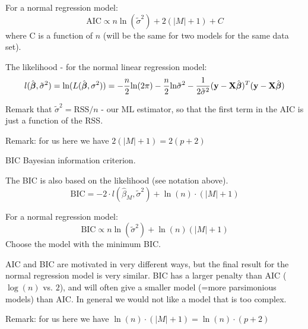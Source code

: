 \documentclass[ignorenonframetext,]{beamer}
\begin{document}
\begin{frame}

For a normal regression model:
\[\text{AIC} \propto n\ln(\tilde{\sigma}^2)+2(\lvert M\rvert +1)+C\]
where C is a function of \(n\) (will be the same for two models for the
same data set).

The likelihood - for the normal linear regression model:
\[l(\hat{\boldsymbol\beta},{\tilde{\sigma}^2})=\text{ln}(L(\hat{\boldsymbol\beta},{\sigma^2}))=-\frac{n}{2}\text{ln}(2\pi)-\frac{n}{2}\text{ln}\tilde{\sigma}^2-\frac{1}{2\tilde{\sigma}^2} ({\bf y}-{\bf X}\hat{\boldsymbol\beta})^T({\bf y}-
{\bf X}\hat{\boldsymbol\beta})\]

Remark that \(\tilde{\sigma}^2=\text{RSS}/n\) - our ML estimator, so
that the first term in the AIC is just a function of the RSS.

Remark: for us here we have \(2(\lvert M\rvert +1)=2(p+2)\)

\end{frame}

\begin{frame}

\begin{block}{BIC Bayesian information criterion.}

The BIC is also based on the likelihood (see notation above).
\[\text{BIC} =-2 \cdot l(\hat{\beta}_M,\tilde{\sigma}^2)+\ln(n)\cdot (\lvert M\rvert +1)\]

For a normal regression model:
\[ \text{BIC} \propto n\ln(\tilde{\sigma}^2)+\ln(n)(\lvert M\rvert +1)\]
Choose the model with the minimum BIC.

AIC and BIC are motivated in very different ways, but the final result
for the normal regression model is very similar. BIC has a larger
penalty than AIC (\(\log(n)\) vs. \(2\)), and will often give a smaller
model (=more parsimonious models) than AIC. In general we would not like
a model that is too complex.

Remark: for us here we have
\(\ln(n)\cdot (\lvert M\rvert +1)=\ln(n)\cdot (p+2)\)

\end{block}

\end{frame}
\end{document}
